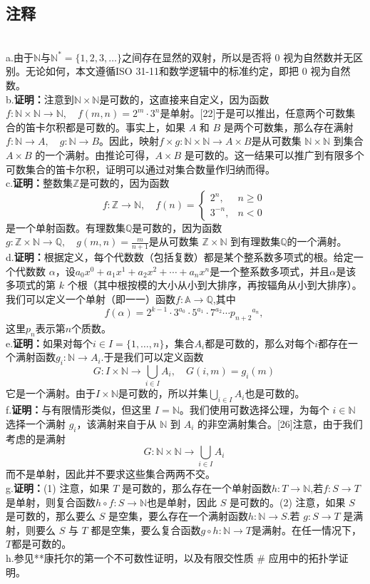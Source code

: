 \subsection{注释}\\
a.由于$\mathbb{N}$与$\mathbb{N}^{*}=\{1,2,3,\dots\}$之间存在显然的双射，所以是否将 0 视为自然数并无区别。无论如何，本文遵循ISO 31-11和数学逻辑中的标准约定，即把 0 视为自然数。\\
b.\textbf{证明：}注意到$\mathbb{N} \times \mathbb{N}$是可数的，这直接来自定义，因为函数$f : \mathbb{N} \times \mathbb{N} \to \mathbb{N}, \quad f(m,n) = 2^{m}\cdot 3^{n}$是单射。[22]于是可以推出，任意两个可数集合的笛卡尔积都是可数的。事实上，如果 $A$ 和 $B$ 是两个可数集，那么存在满射$
f : \mathbb{N} \to A, \quad g : \mathbb{N} \to B$。因此，映射$f \times g : \mathbb{N} \times \mathbb{N} \to A \times B$是从可数集 $\mathbb{N} \times \mathbb{N}$ 到集合 $A \times B$ 的一个满射。由推论可得，$A \times B$ 是可数的。这一结果可以推广到有限多个可数集合的笛卡尔积，证明可以通过对集合数量作归纳而得。\\
c.\textbf{证明：}整数集$\mathbb{Z}$是可数的，因为函数
$$
f : \mathbb{Z} \to \mathbb{N}, \quad 
f(n) = 
\begin{cases} 
2^{n}, & n \geq 0 \\[6pt] 
3^{-n}, & n < 0 
\end{cases}~
$$
是一个单射函数。有理数集$\mathbb{Q}$是可数的，因为函数$g : \mathbb{Z} \times \mathbb{N} \to \mathbb{Q}, \quad g(m,n) = \frac{m}{n+1}$是从可数集 $\mathbb{Z} \times \mathbb{N}$ 到有理数集$\mathbb{Q}$的一个满射。\\
d.\textbf{证明：}根据定义，每个代数数（包括复数）都是某个整系数多项式的根。给定一个代数数 $\alpha$，设$a_{0}x^{0} + a_{1}x^{1} + a_{2}x^{2} + \cdots + a_{n}x^{n}$是一个整系数多项式，并且$\alpha$是该多项式的第 $k$ 个根（其中根按模的大小从小到大排序，再按辐角从小到大排序）。我们可以定义一个单射（即一一）函数$f : \mathbb{A} \to \mathbb{Q}$,其中
$$
f(\alpha) = 2^{k-1} \cdot 3^{a_{0}} \cdot 5^{a_{1}} \cdot 7^{a_{2}} \cdots {p_{n+2}}^{a_{n}},~
$$
这里$p_{n}$表示第$n$个质数。\\
e.\textbf{证明：}如果对每个$i \in I = \{1, \dots , n\}$，集合$A_i$都是可数的，那么对每个$i$都存在一个满射函数$g_i : \mathbb{N} \to A_i$.于是我们可以定义函数
$$
G : I \times \mathbb{N} \to \bigcup_{i \in I} A_i, \quad G(i,m) = g_i(m)~
$$
它是一个满射。由于$I \times \mathbb{N}$是可数的，所以并集$\bigcup_{i \in I} A_i$也是可数的。\\
f.\textbf{证明：}与有限情形类似，但这里 $I = \mathbb{N}$。我们使用可数选择公理，为每个 $i \in \mathbb{N}$ 选择一个满射 $g_i$，该满射来自于从 $\mathbb{N}$ 到 $A_i$ 的非空满射集合。[26]注意，由于我们考虑的是满射
$$
G : \mathbb{N} \times \mathbb{N} \to \bigcup_{i \in I} A_i~
$$
而不是单射，因此并不要求这些集合两两不交。\\
g.\textbf{证明：}(1) 注意，如果 $T$ 是可数的，那么存在一个单射函数$h : T \to \mathbb{N}$,若$f : S \to T$是单射，则复合函数$h \circ f : S \to \mathbb{N}$也是单射，因此 $S$ 是可数的。(2) 注意，如果 $S$ 是可数的，那么要么 $S$ 是空集，要么存在一个满射函数$h : \mathbb{N} \to S$.若 $g : S \to T$ 是满射，则要么 $S$ 与 $T$ 都是空集，要么复合函数$g \circ h : \mathbb{N} \to T$是满射。在任一情况下，$T$都是可数的。\\
h.参见**康托尔的第一个不可数性证明，以及有限交性质 # 应用中的拓扑学证明。
